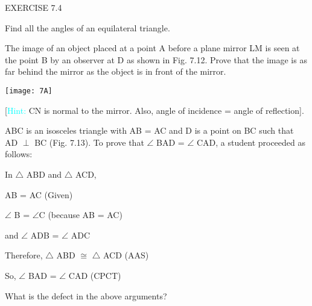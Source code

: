 \documentclass[11pt] {article}
\begin{document}

\begin{center}
\color{cyan}
	{\Large EXERCISE 7.4}
\end{center}

\begin {enumerate}
\item Find all the angles of an equilateral triangle.

\begin{minipage}[h]{0.65\linewidth}
\item The image of an object placed at a point A before a plane mirror LM is seen at the point B by an observer at D as shown in Fig. 7.12. Prove that the image is as far behind the mirror as the object is in front  of the mirror.                              
\end{minipage}
\hfill
\begin{minipage}[h]{0.35\linewidth}
	\texttt{[image: 7A]}
\end{minipage}

[\textcolor{cyan}{Hint:} CN is normal to the mirror. Also, angle of incidence = angle of reflection].

\item ABC is an isosceles triangle with AB = AC and D is a point on BC such that AD $\perp$  BC (Fig. 7.13). To prove that $\angle$ BAD = $\angle$ CAD, a student proceeded as follows:

\begin{minipage}[h]{0.70\linewidth}
In $\triangle$  ABD and $\triangle$  ACD,

\hspace{2.6 cm}  AB = AC \hspace{1cm}(Given)

\hspace{2.5cm} $\angle$ B = $\angle$C \hspace{1cm}(because AB = AC)

and \hspace{1.3cm}  $\angle$ ADB = $\angle$ ADC

Therefore, \hspace{0.3 cm}$\triangle$  ABD $\cong$  $\triangle$ ACD (AAS)

So, \hspace{1.4cm}  $\angle$ BAD = $\angle$ CAD (CPCT)

What is the defect in the above arguments?


\end{minipage}
\end{enumerate}
\end{document}
